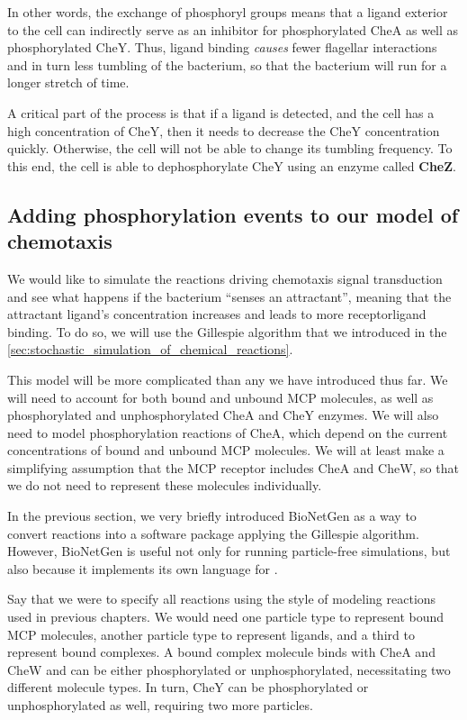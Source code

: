 In other words, the exchange of phosphoryl groups means that a ligand exterior to the cell can indirectly serve as an inhibitor for phosphorylated CheA as well as phosphorylated CheY. Thus, ligand binding \textit{causes} fewer flagellar interactions and in turn less tumbling of the bacterium, so that the bacterium will run for a longer stretch of time.

A critical part of the process is that if a ligand is detected, and the cell has a high concentration of CheY, then it needs to decrease the CheY concentration quickly. Otherwise, the cell will not be able to change its tumbling frequency. To this end, the cell is able to dephosphorylate CheY using an enzyme called \textbf{CheZ}.


\FloatBarrier
{}
{}
\subsection{Adding phosphorylation events to our model of chemotaxis}


We would like to simulate the reactions driving chemotaxis signal transduction and see what happens if the bacterium ``senses an attractant'', meaning that the attractant ligand's concentration increases and leads to more receptor\-ligand binding. To do so, we will use the Gillespie algorithm that we introduced in the \autoref{sec:stochastic_simulation_of_chemical_reactions}.

This model will be more complicated than any we have introduced thus far. We will need to account for both bound and unbound MCP molecules, as well as phosphorylated and unphosphorylated CheA and CheY enzymes. We will also need to model phosphorylation reactions of CheA, which depend on the current concentrations of bound and unbound MCP molecules. We will at least make a simplifying assumption that the MCP receptor includes CheA and CheW, so that we do not need to represent these molecules individually.

In the previous section, we very briefly introduced BioNetGen as a way to convert reactions into a software package applying the Gillespie algorithm. However, BioNetGen is useful not only for running particle-free simulations, but also because it implements its own language for .

Say that we were to specify all reactions using the style of modeling reactions used in previous chapters. We would need one particle type to represent bound MCP molecules, another particle type to represent ligands, and a third to represent bound complexes. A bound complex molecule binds with CheA and CheW and can be either phosphorylated or unphosphorylated, necessitating two different molecule types. In turn, CheY can be phosphorylated or unphosphorylated as well, requiring two more particles.

